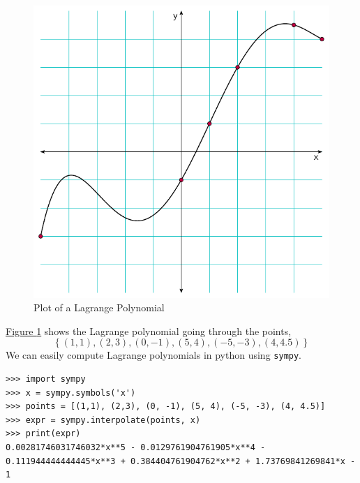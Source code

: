 \begin{figure}[H]
\centering
\includegraphics[scale=0.75]{polynomials/figures/lagrange_poly_plot1.pdf}
\caption{Plot of a Lagrange Polynomial}
\label{fig:lagrange_poly_plot1}
\end{figure}

\hyperref[fig:lagrange_poly_plot1]{Figure \ref{fig:lagrange_poly_plot1}} shows the Lagrange polynomial going through 
the points, 
\[ \left\{(1,1), (2,3), (0, -1), (5, 4), (-5, -3), (4, 4.5) \right\}\] 
We can easily compute Lagrange polynomials in python using \texttt{sympy}.

\begin{mdcode}
\begin{verbatim}
>>> import sympy
>>> x = sympy.symbols('x')
>>> points = [(1,1), (2,3), (0, -1), (5, 4), (-5, -3), (4, 4.5)]
>>> expr = sympy.interpolate(points, x)
>>> print(expr)
0.00281746031746032*x**5 - 0.0129761904761905*x**4 - 0.111944444444445*x**3 + 0.384404761904762*x**2 + 1.73769841269841*x - 1
\end{verbatim}
\end{mdcode}


